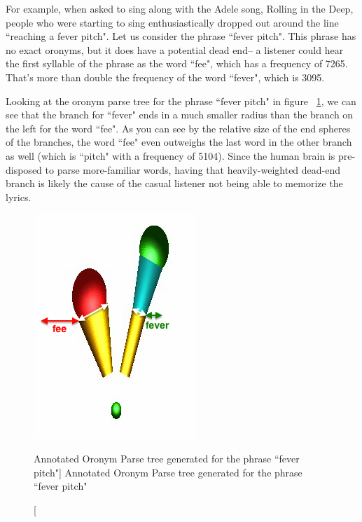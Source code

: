  For example, when asked to sing along with the Adele song, Rolling in the Deep, people who were starting to sing enthusiastically dropped out around the line ``reaching a fever pitch"\cite{frontPorchBandAdeleCover}.  Let us consider the phrase ``fever pitch".  This phrase has no exact oronyms, but it does have a potential dead end-- a listener could hear the first syllable of the phrase as the word ``fee", which has a frequency of 7265.  That's more than double the frequency of the word ``fever", which is 3095.  

Looking at the oronym parse tree for the phrase ``fever pitch" in figure ~\ref{fig:feverPitchOronymTree}, we can see that the branch for ``fever" ends in a much smaller radius than the branch on the left for the word ``fee".  As you can see by the relative size of the end spheres of the branches, the word ``fee" even outweighs the last word in the other branch as well (which is ``pitch" with a frequency of 5104). Since the human brain is pre-disposed to parse more-familiar words, having that heavily-weighted dead-end branch is likely the cause of the casual listener not being able to memorize the lyrics.
\begin{figure}[h]
\includegraphics[width=.5\textwidth]{feverPitchTreeAnnotated.jpg}
\captionfonts
\caption[Annotated Oronym Parse tree  generated for the phrase ``fever pitch"]{ Annotated Oronym Parse tree generated for the phrase ``fever pitch" }
\label{fig:feverPitchOronymTree}
\end{figure}



